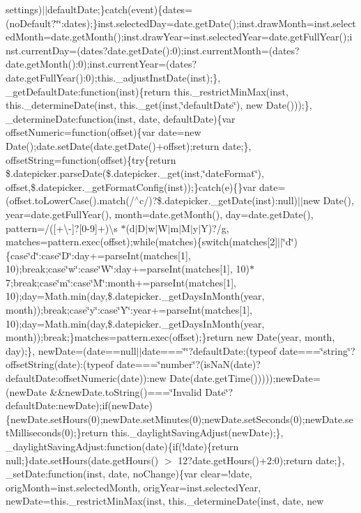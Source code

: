 {{\begin{DoxyParamCaption}
settings)$\vert$$\vert$default\+Date;\}catch(event)\{dates=(no\+Default?\char`\"{}\char`\"{}\+:dates);\}inst.\+selected\+Day=date.\+get\+Date();inst.\+draw\+Month=inst.\+selected\+Month=date.\+get\+Month();inst.\+draw\+Year=inst.\+selected\+Year=date.\+get\+Full\+Year();inst.\+current\+Day=(dates?date.\+get\+Date()\+:0);inst.\+current\+Month=(dates?date.\+get\+Month()\+:0);inst.\+current\+Year=(dates?date.\+get\+Full\+Year()\+:0);this.\+\_\+adjust\+Inst\+Date(inst);\}, \+\_\+get\+Default\+Date\+:function(inst)\{return this.\+\_\+restrict\+Min\+Max(inst, this.\+\_\+determine\+Date(inst, this.\+\_\+get(inst,\char`\"{}default\+Date\char`\"{}), new Date()));\}, \+\_\+determine\+Date\+:function(inst, date, default\+Date)\{var offset\+Numeric=function(offset)\{var date=new Date();date.\+set\+Date(date.\+get\+Date()+offset);return date;\}, offset\+String=function(offset)\{try\{return \$.\+datepicker.\+parse\+Date(\$.\+datepicker.\+\_\+get(inst,\char`\"{}date\+Format\char`\"{}), offset,\$.\+datepicker.\+\_\+get\+Format\+Config(inst));\}catch(e)\{\}var date=(offset.\+to\+Lower\+Case().\+match(/$^\wedge$c/)?\$.\+datepicker.\+\_\+get\+Date(inst)\+:null)$\vert$$\vert$new Date(), year=date.\+get\+Full\+Year(), month=date.\+get\+Month(), day=date.\+get\+Date(), pattern=/(\mbox{[}+\textbackslash{}-\/\mbox{]}?\mbox{[}0-\/9\mbox{]}+)\textbackslash{}s $\ast$(d$\vert$\+D$\vert$w$\vert$\+W$\vert$m$\vert$\+M$\vert$y$\vert$\+Y)?/g, matches=pattern.\+exec(offset);while(matches)\{switch(matches\mbox{[}2\mbox{]}$\vert$$\vert$\char`\"{}d\char`\"{})\{case\char`\"{}d\char`\"{}\+:case\char`\"{}\+D\char`\"{}\+:day+=parse\+Int(matches\mbox{[}1\mbox{]}, 10);break;case\char`\"{}w\char`\"{}\+:case\char`\"{}\+W\char`\"{}\+:day+=parse\+Int(matches\mbox{[}1\mbox{]}, 10)$\ast$7;break;case\char`\"{}m\char`\"{}\+:case\char`\"{}\+M\char`\"{}\+:month+=parse\+Int(matches\mbox{[}1\mbox{]}, 10);day=\+Math.\+min(day,\$.\+datepicker.\+\_\+get\+Days\+In\+Month(year, month));break;case\char`\"{}y\char`\"{}\+:case\char`\"{}\+Y\char`\"{}\+:year+=parse\+Int(matches\mbox{[}1\mbox{]}, 10);day=\+Math.\+min(day,\$.\+datepicker.\+\_\+get\+Days\+In\+Month(year, month));break;\}matches=pattern.\+exec(offset);\}return new Date(year, month, day);\}, new\+Date=(date==null$\vert$$\vert$date===\char`\"{}\char`\"{}?default\+Date\+:(typeof date===\char`\"{}string\char`\"{}?offset\+String(date)\+:(typeof date===\char`\"{}number\char`\"{}?(is\+Na\+N(date)?default\+Date\+:offset\+Numeric(date))\+:new Date(date.\+get\+Time()))));new\+Date=(new\+Date \&\&new\+Date.\+to\+String()===\char`\"{}\+Invalid Date\char`\"{}?default\+Date\+:new\+Date);if(new\+Date)\{new\+Date.\+set\+Hours(0);new\+Date.\+set\+Minutes(0);new\+Date.\+set\+Seconds(0);new\+Date.\+set\+Milliseconds(0);\}return this.\+\_\+daylight\+Saving\+Adjust(new\+Date);\}, \+\_\+daylight\+Saving\+Adjust\+:function(date)\{if(!date)\{return null;\}date.\+set\+Hours(date.\+get\+Hours() $>$ 12?date.\+get\+Hours()+2\+:0);return date;\}, \+\_\+set\+Date\+:function(inst, date, no\+Change)\{var clear=!date, orig\+Month=inst.\+selected\+Month, orig\+Year=inst.\+selected\+Year, new\+Date=this.\+\_\+restrict\+Min\+Max(inst, this.\+\_\+determine\+Date(inst, date, new 
\end{DoxyParamCaption}}}
